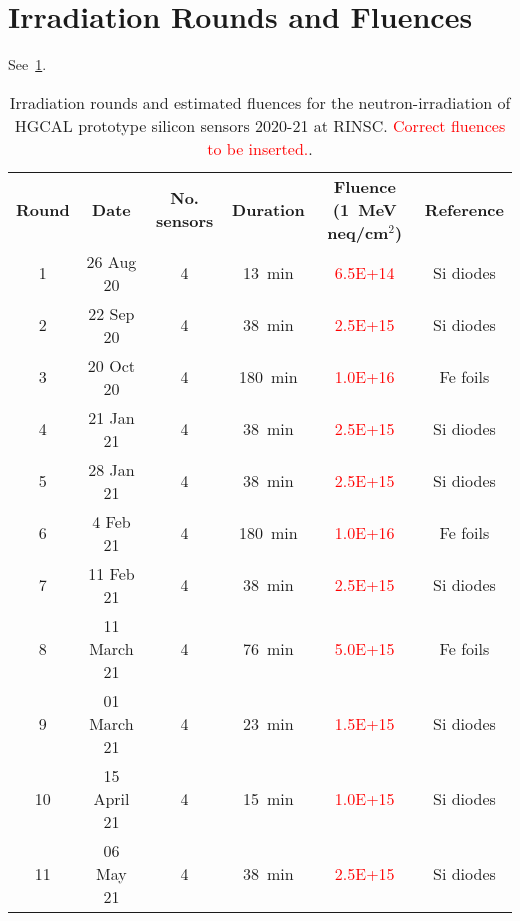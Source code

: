\section{Irradiation Rounds and Fluences}
\label{appendix:irrad_rounds}
See~\ref{table:irrads}.
\begin{table}[h]
	\centering
	\begin{tabular}{c||ccccc}
		\textbf{Round}& \textbf{Date} & \textbf{No. sensors} & \textbf{Duration} & \textbf{Fluence (\SI{1}{\mega\eV} neq/cm$^2$)} & \textbf{Reference} \\
		1 & 26 Aug 20 & 4 & \SI{13}{\minute} & \textcolor{red}{6.5E+14} & Si diodes \\
		2 & 22 Sep 20 & 4 & \SI{38}{\minute} & \textcolor{red}{2.5E+15} & Si diodes \\
		3 & 20 Oct 20 & 4 & \SI{180}{\minute} & \textcolor{red}{1.0E+16} & Fe foils \\
		4 & 21 Jan 21 & 4 & \SI{38}{\minute} & \textcolor{red}{2.5E+15} & Si diodes \\
		5 & 28 Jan 21 & 4 & \SI{38}{\minute} & \textcolor{red}{2.5E+15} & Si diodes \\
		6 & 4 Feb 21 & 4 & \SI{180}{\minute} & \textcolor{red}{1.0E+16} & Fe foils \\
		7 & 11 Feb 21 & 4 & \SI{38}{\minute} & \textcolor{red}{2.5E+15} & Si diodes \\
		8 & 11 March 21 & 4 & \SI{76}{\minute} & \textcolor{red}{5.0E+15} & Fe foils \\
		9 & 01 March 21 & 4 & \SI{23}{\minute} & \textcolor{red}{1.5E+15} & Si diodes \\
		10 & 15 April 21 & 4 & \SI{15}{\minute} & \textcolor{red}{1.0E+15} & Si diodes \\
		11 & 06 May 21 & 4 & \SI{38}{\minute} & \textcolor{red}{2.5E+15} & Si diodes \\
	\end{tabular}
	\caption{Irradiation rounds and estimated fluences for the neutron-irradiation of HGCAL prototype silicon sensors 2020-21 at RINSC. \textcolor{red}{Correct fluences to be inserted.}.}
	\label{table:irrads}
\end{table}


